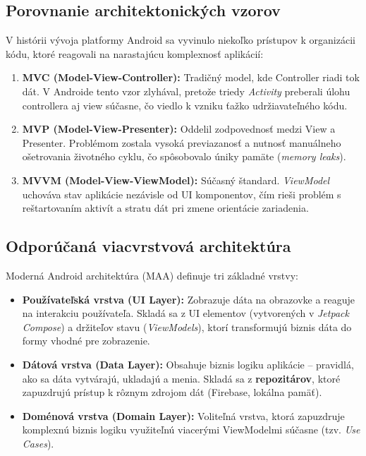 \subsection{Porovnanie architektonických vzorov}
V histórii vývoja platformy Android sa vyvinulo niekoľko prístupov k organizácii kódu, ktoré reagovali na narastajúcu komplexnosť aplikácií:

\begin{enumerate}
    \item \textbf{MVC (Model-View-Controller):} Tradičný model, kde Controller riadi tok dát. V Androide tento vzor zlyhával, pretože triedy \textit{Activity} preberali úlohu controllera aj view súčasne, čo viedlo k vzniku ťažko udržiavateľného kódu.
    \item \textbf{MVP (Model-View-Presenter):} Oddelil zodpovednosť medzi View a Presenter. Problémom zostala vysoká previazanosť a nutnosť manuálneho ošetrovania životného cyklu, čo spôsobovalo úniky pamäte (\textit{memory leaks}).
    \item \textbf{MVVM (Model-View-ViewModel):} Súčasný štandard. \textit{ViewModel} uchováva stav aplikácie nezávisle od UI komponentov, čím rieši problém s reštartovaním aktivít a stratu dát pri zmene orientácie zariadenia.
\end{enumerate}

\subsection{Odporúčaná viacvrstvová architektúra}
Moderná Android architektúra (MAA) definuje tri základné vrstvy:

\begin{itemize}
    \item \textbf{Používateľská vrstva (UI Layer):} Zobrazuje dáta na obrazovke a reaguje na interakciu používateľa. Skladá sa z UI elementov (vytvorených v \textit{Jetpack Compose}) a držiteľov stavu (\textit{ViewModels}), ktorí transformujú biznis dáta do formy vhodné pre zobrazenie.
    \item \textbf{Dátová vrstva (Data Layer):} Obsahuje biznis logiku aplikácie – pravidlá, ako sa dáta vytvárajú, ukladajú a menia. Skladá sa z \textbf{repozitárov}, ktoré zapuzdrujú prístup k rôznym zdrojom dát (Firebase, lokálna pamäť).
    \item \textbf{Doménová vrstva (Domain Layer):} Voliteľná vrstva, ktorá zapuzdruje komplexnú biznis logiku využiteľnú viacerými ViewModelmi súčasne (tzv. \textit{Use Cases}).
\end{itemize}

